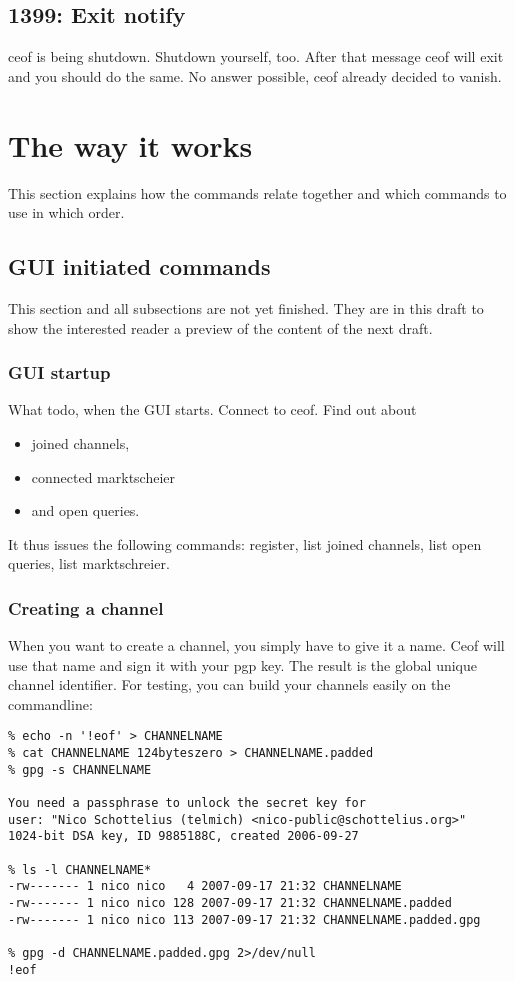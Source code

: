 \documentclass[12pt,a4paper]{book}
\begin{document}
\subsection{1399: Exit notify}
ceof is being shutdown.
Shutdown yourself, too.
After that message ceof will exit and you should do the same.
No answer possible, ceof already decided to vanish.
\section{The way it works}
This section explains how the commands relate together and which commands to use
in which order.

\subsection{GUI initiated commands}
This section and all subsections are not yet finished. They
are in this draft to show the interested reader a preview of the
content of the next draft.
\subsubsection{GUI startup}
What todo, when the GUI starts.
Connect to ceof. Find out about
\begin{itemize}
\item joined channels,
\item connected marktscheier
\item and open queries.
\end{itemize}
It thus issues the following commands:
register, list joined channels, list open queries, list marktschreier.
\subsubsection{Creating a channel}
When you want to create a channel, you simply have to give it a name.
Ceof will use that name and sign it with your pgp key. The result is the
global unique channel identifier. For testing, you can build your channels
easily on the commandline:
\begin{verbatim}
% echo -n '!eof' > CHANNELNAME
% cat CHANNELNAME 124byteszero > CHANNELNAME.padded
% gpg -s CHANNELNAME 

You need a passphrase to unlock the secret key for
user: "Nico Schottelius (telmich) <nico-public@schottelius.org>"
1024-bit DSA key, ID 9885188C, created 2006-09-27

% ls -l CHANNELNAME*
-rw------- 1 nico nico   4 2007-09-17 21:32 CHANNELNAME
-rw------- 1 nico nico 128 2007-09-17 21:32 CHANNELNAME.padded
-rw------- 1 nico nico 113 2007-09-17 21:32 CHANNELNAME.padded.gpg

% gpg -d CHANNELNAME.padded.gpg 2>/dev/null
!eof
\end{verbatim}
\end{document}
